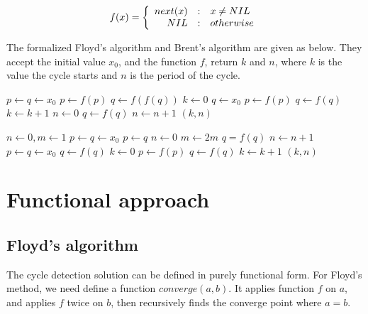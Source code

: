 \documentclass{article}
\begin{document}
\begin{equation}
f(x) = \left \{
  \begin{array}
  {r@{\quad:\quad}l}
  next(x) & x \neq NIL \\
  NIL & otherwise
  \end{array}
\right.
\end{equation}

The formalized Floyd's algorithm and Brent's algorithm are given as below. They accept the initial value
$x_0$, and the function $f$, return $k$ and $n$, where $k$ is the value the cycle starts and $n$ is the
period of the cycle.

\begin{algorithmic}[1]
  \State $p \gets q \gets x_0$ 
  \Repeat
    \State $p \gets f(p)$
    \State $q \gets f(f(q))$
   
  \Statex
  \State $k \gets 0$
  \State $q \gets x_0$ 
   
    \State $p \gets f(p)$
    \State $q \gets f(q)$
    \State $k \gets k + 1$
  \EndWhile
  \Statex
  \State $n \gets 0$
  \Repeat {}
    \State $q \gets f(q)$
    \State $n \gets n + 1$
  \State \Return $(k, n)$
\EndFunction
\end{algorithmic}

\begin{algorithmic}[1]
  \State $n \gets 0, m \gets 1$
  \State $p \gets q \gets x_0$
  \Repeat{}
      \State $p \gets q$ 
      \State $n \gets 0$
      \State $m \gets 2m$
    \EndIf
    \State $q = f(q)$
    \State $n \gets n + 1$
   
  \Statex
  \State $ p \gets q \gets x_0$ 
   
    \State $q \gets f(q)$
  \EndLoop
  \Statex
  \State $k \gets 0$
   
    \State $p \gets f(p)$
    \State $q \gets f(q)$
    \State $k \gets k + 1$
  \EndWhile
  \State \Return $(k, n)$
\EndFunction
\end{algorithmic}

\section{Functional approach}
\subsection{Floyd's algorithm}
The cycle detection solution can be defined in purely functional form. For Floyd's method, we
need define a function $converge(a, b)$. It applies function $f$ on $a$, and applies $f$ twice
on $b$, then recursively finds the converge point where $a = b$.
\end{document}
